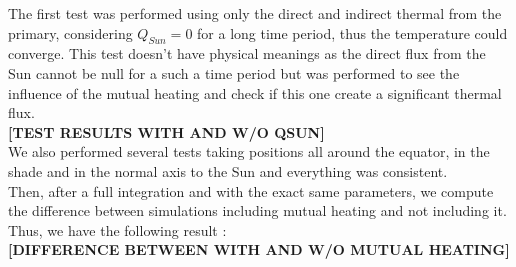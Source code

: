 The first test was performed using only the direct and indirect thermal from the primary, considering $Q_{Sun}=0$ for a long time period, thus the temperature could converge. This test doesn't have physical meanings as the direct flux from the Sun cannot be null for a such a time period but was performed to see the influence of the mutual heating and check if this one create a significant thermal flux.\\

\textbf{[TEST RESULTS WITH AND W/O QSUN]}\\

We also performed several tests taking positions all around the equator, in the shade and in the normal axis to the Sun and everything was consistent.\\

Then, after a full integration and with the exact same parameters, we compute the difference between simulations including mutual heating and not including it.\\

Thus, we have the following result :\\

\textbf{[DIFFERENCE BETWEEN WITH AND W/O MUTUAL HEATING]}
